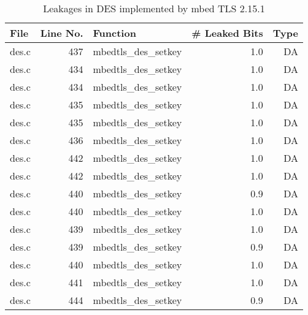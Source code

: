 \begin{table}[h!]
\centering\tiny\scriptsize
\caption{Leakages in DES implemented by mbed TLS 2.15.1}\label{tab:DESmbed TLS2.15.1}
\begin{tabular}{lrlrr}
\hline
\textbf{File} & \textbf{Line No.} & \textbf{Function} & \textbf{\# Leaked Bits} & \textbf{Type} \\\hline
des.c& 437&mbedtls\_des\_setkey&1.0 &DA\\
des.c& 434&mbedtls\_des\_setkey&1.0 &DA\\
des.c& 434&mbedtls\_des\_setkey&1.0 &DA\\
des.c& 435&mbedtls\_des\_setkey&1.0 &DA\\
des.c& 435&mbedtls\_des\_setkey&1.0 &DA\\
des.c& 436&mbedtls\_des\_setkey&1.0 &DA\\
des.c& 442&mbedtls\_des\_setkey&1.0 &DA\\
des.c& 442&mbedtls\_des\_setkey&1.0 &DA\\
des.c& 440&mbedtls\_des\_setkey&0.9 &DA\\
des.c& 440&mbedtls\_des\_setkey&1.0 &DA\\
des.c& 439&mbedtls\_des\_setkey&1.0 &DA\\
des.c& 439&mbedtls\_des\_setkey&0.9 &DA\\
des.c& 440&mbedtls\_des\_setkey&1.0 &DA\\
des.c& 441&mbedtls\_des\_setkey&1.0 &DA\\
des.c& 444&mbedtls\_des\_setkey&0.9 &DA\\
\hline
\end{tabular}
\renewcommand{\baselinestretch}{1.0}\selectfont
\end{table}
